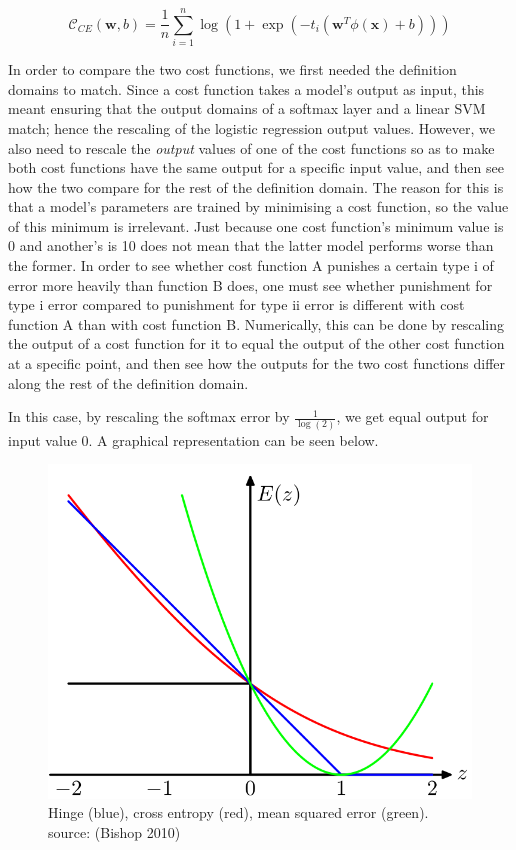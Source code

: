 \documentclass[a4paper,11pt]{article}
\begin{document}
\begin{equation}
\mathcal{C}_{CE}(\textbf{w}, b) = \frac{1}{n} \sum\limits_{i=1}^{n}\log(1 + \exp(-t_i(\textbf{w}^T \phi(\textbf{x}) + b)))
\end{equation}

In order to compare the two cost functions, we first needed the definition domains to match. Since a cost function takes a model's output as input, this meant ensuring that the output domains of a softmax layer and a linear SVM match; hence the rescaling of the logistic regression output values. However, we also need to rescale the \textit{output} values of one of the cost functions so as to make both cost functions have the same output for a specific input value, and then see how the two compare for the rest of the definition domain. The reason for this is that a model's parameters are trained by minimising a cost function, so the value of this minimum is irrelevant. Just because one cost function's minimum value is 0 and another's is 10 does not mean that the latter model performs worse than the former. In order to see whether cost function A punishes a certain type i of error more heavily than function B does, one must see whether punishment for type i error compared to punishment for type ii error is different with cost function A than with cost function B. Numerically, this can be done by rescaling the output of a cost function for it to equal the output of the other cost function at a specific point, and then see how the outputs for the two cost functions differ along the rest of the definition domain.

In this case, by rescaling the softmax error by $\frac{1}{\log(2)}$, we get equal output for input value 0. A graphical representation can be seen below. \\

\begin{figure}[h!]
	\centering
	\includegraphics[scale=0.3]{images/hinge_vs_ce.png}
	\caption{Hinge (blue), cross entropy (red), mean squared error (green). source: (Bishop 2010)}
\end{figure}
\end{document}
